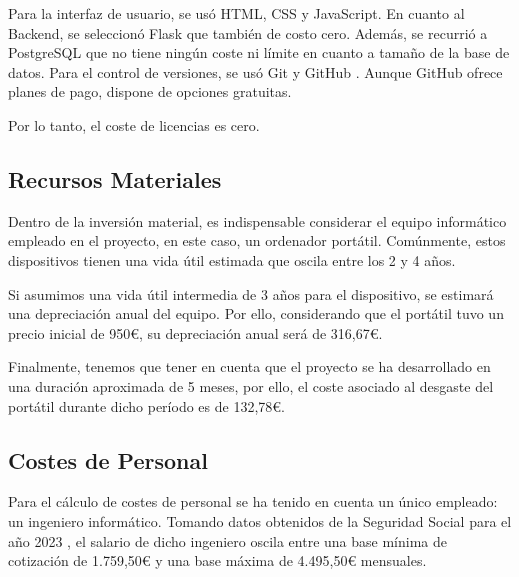 Para la interfaz de usuario, se usó HTML, CSS y JavaScript. En cuanto al Backend, se seleccionó Flask que también de costo cero. Además, se recurrió a PostgreSQL que no tiene ningún coste ni límite en cuanto a tamaño de la base de datos. Para el control de versiones, se usó Git y GitHub \cite{personalgithub}. Aunque GitHub ofrece planes de pago, dispone de opciones gratuitas. 

Por lo tanto, el coste de licencias es cero. 

\subsection{Recursos Materiales}

Dentro de la inversión material, es indispensable considerar el equipo informático empleado en el proyecto, en este caso, un ordenador portátil. Comúnmente, estos dispositivos tienen una vida útil estimada que oscila entre los 2 y 4 años. 

Si asumimos una vida útil intermedia de 3 años para el dispositivo, se estimará una depreciación anual del equipo. Por ello, considerando que el portátil tuvo un precio inicial de 950€, su depreciación anual será de 316,67€. 

Finalmente, tenemos que tener en cuenta que el proyecto se ha desarrollado en una duración aproximada de 5 meses, por ello, el coste asociado al desgaste del portátil durante dicho período es de 132,78€.

\subsection{Costes de Personal}

Para el cálculo de costes de personal se ha tenido en cuenta un único empleado: un ingeniero informático. Tomando datos obtenidos de la Seguridad Social para el año 2023 \cite{seg-social}, el salario de dicho ingeniero oscila entre una base mínima de cotización de 1.759,50€ y una base máxima de 4.495,50€ mensuales.

